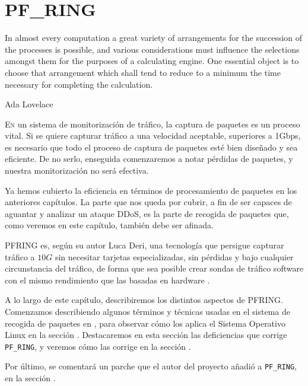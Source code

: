 \chapter{PF\_RING}
\pagestyle{esitscCD}

\epigraph{In almost every computation a great variety of arrangements for the succession of the processes is possible, 
and various considerations must influence the selections amongst them for the purposes of a calculating engine. One 
essential object is to choose that arrangement which shall tend to reduce to a minimum the time necessary for completing 
the calculation.}{Ada Lovelace}

\lettrine[lraise=-0.1, lines=2, loversize=0.25]{E}n un sistema de monitorización de tráfico, la captura de paquetes es 
un proceso vital. Si se quiere capturar tráfico a una velocidad aceptable, superiores a 1Gbps, es necesario que todo el 
proceso de captura de paquetes esté bien diseñado y sea eficiente. De no serlo, enseguida comenzaremos a notar 
pérdidas de paquetes, y nuestra monitorización no será efectiva.

Ya hemos cubierto la eficiencia en términos de procesamiento de paquetes en los anteriores capítulos. La parte que nos 
queda por cubrir, a fin de ser capaces de aguantar y analizar un ataque \gls{DDoS}, es la parte de recogida de paquetes 
que, como veremos en este capítulo, también debe ser afinada.

\gls{PFRING} es, según su autor Luca Deri, una tecnología que persigue capturar tráfico a $10G$ sin necesitar 
tarjetas especializadas, sin pérdidas y bajo cualquier circunstancia del tráfico, de forma que sea posible crear sondas 
de tráfico software con el mismo rendimiento que las basadas en hardware \cite{LucaDeriPFRING}.

A lo largo de este capítulo, describiremos los distintos aspectos de \gls{PFRING}. Comenzamos describiendo algunos 
términos y técnicas usadas en el sistema de recogida de paquetes en , para observar 
cómo los aplica el Sistema Operativo Linux en la sección . Destacaremos en esta sección las 
deficiencias que corrige \texttt{PF\_RING}, y veremos cómo las corrige en la sección .

Por último, se comentará un parche que el autor del proyecto añadió a \texttt{PF\_RING}, en la sección 
.


